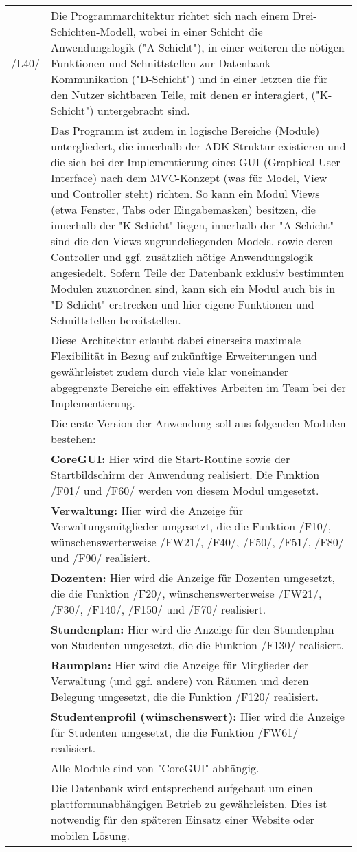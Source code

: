 \begin{tabular}{p{1.5cm}p{14.5cm}}
						
	 /L40/	& Die Programmarchitektur richtet sich nach einem Drei-Schichten-Modell, wobei in einer Schicht die Anwendungslogik ("A-Schicht"), in einer weiteren die nötigen Funktionen und Schnittstellen zur Datenbank-Kommunikation ("D-Schicht") und in einer letzten die für den Nutzer sichtbaren Teile, mit denen er interagiert, ("K-Schicht") untergebracht sind.\\
	 & Das Programm ist zudem in logische Bereiche (Module) untergliedert, die innerhalb der ADK-Struktur existieren und die sich bei der Implementierung eines GUI (Graphical User Interface) nach dem MVC-Konzept (was für Model, View und Controller steht) richten. So kann ein Modul Views (etwa Fenster, Tabs oder Eingabemasken) besitzen, die innerhalb der "K-Schicht" liegen, innerhalb der "A-Schicht" sind die den Views zugrundeliegenden Models, sowie deren Controller und ggf. zusätzlich nötige Anwendungslogik angesiedelt. Sofern Teile der Datenbank exklusiv bestimmten Modulen zuzuordnen sind, kann sich ein Modul auch bis in "D-Schicht" erstrecken und hier eigene Funktionen und Schnittstellen bereitstellen. \\
	 & Diese Architektur erlaubt dabei einerseits maximale Flexibilität in Bezug auf zukünftige Erweiterungen und gewährleistet zudem durch viele klar voneinander abgegrenzte Bereiche ein effektives Arbeiten im Team bei der Implementierung. \\[0.15cm]
	 &	Die erste Version der Anwendung soll aus folgenden Modulen bestehen: \\[0.15cm]
	 &	\textbf{CoreGUI:} Hier wird die Start-Routine sowie der Startbildschirm der Anwendung realisiert. Die Funktion /F01/ und /F60/ werden von diesem Modul umgesetzt.\\[0.15cm]
	 &	\textbf{Verwaltung:} Hier wird die Anzeige für Verwaltungsmitglieder umgesetzt, die die Funktion /F10/, wünschenswerterweise /FW21/, /F40/, /F50/, /F51/, /F80/ und /F90/ realisiert.\\[0.15cm]
	 &	\textbf{Dozenten:} Hier wird die Anzeige für Dozenten umgesetzt, die die Funktion /F20/, wünschenswerterweise /FW21/, /F30/, /F140/, /F150/ und /F70/ realisiert.\\[0.15cm]
	 &	\textbf{Stundenplan:} Hier wird die Anzeige für den Stundenplan von Studenten umgesetzt, die die Funktion /F130/ realisiert.\\
	 &	\textbf{Raumplan:} Hier wird die Anzeige für Mitglieder der Verwaltung (und ggf. andere) von Räumen und deren Belegung umgesetzt, die die Funktion /F120/ realisiert.\\[0.15cm]
	 &	\textbf{Studentenprofil (wünschenswert):} Hier wird die Anzeige für Studenten umgesetzt, die die Funktion /FW61/ realisiert.\\[0.15cm]
	 & Alle Module sind von "CoreGUI" abhängig.\\[0.25cm]
	 & Die Datenbank wird entsprechend aufgebaut um einen plattformunabhängigen Betrieb zu gewährleisten. Dies ist notwendig für den späteren Einsatz einer Website oder mobilen Lösung.

\end{tabular}


